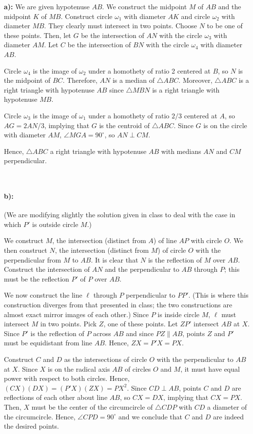 \begin{mdsoln}

    \textbf{a):} We are given hypotenuse $AB$. We construct the midpoint $M$ of $AB$ and the midpoint $K$ of $MB$. Construct circle $\omega_1$ with diameter $AK$ and circle $\omega_2$ with diameter $MB$. They clearly must intersect in two points. Choose $N$ to be one of these points. Then, let $G$ be the intersection of $AN$ with the circle $\omega_3$ with diameter $AM$. Let $C$ be the intersection of $BN$ with the circle $\omega_4$ with diameter $AB$.

Circle $\omega_4$ is the image of $\omega_2$ under a homothety of ratio 2 centered at $B$, so $N$ is the midpoint of $BC$. Therefore, $AN$ is a median of $\triangle ABC$. Moreover, $\triangle ABC$ is a right triangle with hypotenuse $AB$ since $\triangle MBN$ is a right triangle with hypotenuse $MB$.

Circle $\omega_3$ is the image of $\omega_1$ under a homothety of ratio $2/3$ centered at $A$, so $AG=2AN/3$, implying that $G$ is the centroid of $\triangle ABC$. Since $G$ is on the circle with diameter $AM$, $\angle MGA=90^\circ$, so $AN\perp CM$.

Hence, $\triangle ABC$ a right triangle with hypotenuse $AB$ with medians $AN$ and $CM$ perpendicular.

~\paragraph{b):} 
(We are modifying slightly the solution given in class to deal with the case in which $P'$ is outside circle $M$.)

We construct $M$, the intersection (distinct from $A$) of line $AP$ with circle $O$. We then construct $N$, the intersection (distinct from $M$) of circle $O$ with the perpendicular from $M$ to $AB$. It is clear that $N$ is the reflection of $M$ over $AB$. Construct the intersection of $AN$ and the perpendicular to $AB$ through $P$; this must be the reflection $P'$ of $P$ over $AB$.

We now construct the line $\ell$ through $P$ perpendicular to $PP'$. (This is where this construction diverges from that presented in class; the two constructions are almost exact mirror images of each other.) Since $P$ is inside circle $M$, $\ell$ must intersect $M$ in two points. Pick $Z$, one of these points. Let $ZP'$ intersect $AB$ at $X$. Since $P'$ is the reflection of $P$ across $AB$ and since $PZ\parallel AB$, points $Z$ and $P'$ must be equidistant from line $AB$. Hence, $ZX=P'X=PX$.

Construct $C$ and $D$ as the intersections of circle $O$ with the perpendicular to $AB$ at $X$. Since $X$ is on the radical axis $AB$ of circles $O$ and $M$, it must have equal power with respect to both circles. Hence, $(CX)(DX)=(P'X)(ZX)=PX^2$. Since $CD\perp AB$, points $C$ and $D$ are reflections of each other about line $AB$, so $CX=DX$, implying that $CX=PX$. Then, $X$ must be the center of the circumcircle of $\triangle CDP$ with $CD$ a diameter of the circumcircle. Hence, $\angle CPD=90^\circ$ and we conclude that $C$ and $D$ are indeed the desired points.
\end{mdsoln}
